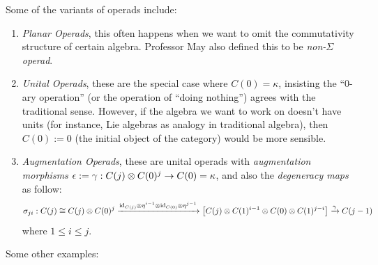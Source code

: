\documentclass{article}
\begin{document}
\hfil

\hfil

Some of the variants of operads include:
\begin{enumerate}
    \item \emph{Planar Operads}, this often happens when we want to omit the commutativity structure of certain algebra. Professor May also defined this to be \emph{non-$\Sigma$ operad}.
    \item \emph{Unital Operads}, these are the special case where $C(0)=\kappa$, insisting the ``0-ary operation'' (or the operation of ``doing nothing'') agrees with the traditional sense. However, if the algebra we want to work on doesn't have units (for instance, Lie algebras as analogy in traditional algebra), then $C(0):=0$ (the initial object of the category) would be more sensible.
    \item \emph{Augmentation Operads}, these are unital operads with \emph{augmentation morphisms} $\epsilon:= \gamma:C(j)\otimes C(0)^j\rightarrow C(0)=\kappa$, and also the \emph{degeneracy maps} as follow:
    \[\sigma_{ji}:C(j)\cong C(j)\otimes C(0)^j \xrightarrow{\mathrm{id}_{C(j)}\otimes \eta^{i-1} \otimes \mathrm{id}_{C(0)}\otimes \eta^{j-1}} \left[C(j)\otimes C(1)^{i-1}\otimes C(0)\otimes C(1)^{j-i}\right]\xrightarrow{\gamma} C(j-1)\]
    where $1\leq i\leq j$.
\end{enumerate}


\hfil

Some other examples:
\end{document}
